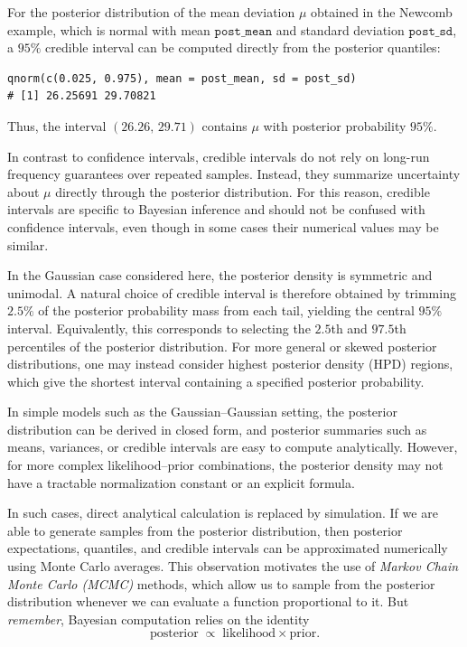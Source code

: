 For the posterior distribution of the mean deviation $\mu$ obtained in the Newcomb example, which is normal with mean $\texttt{post\_mean}$ and standard deviation $\texttt{post\_sd}$, a $95\%$ credible interval can be computed directly from the posterior quantiles:
\begin{verbatim}
qnorm(c(0.025, 0.975), mean = post_mean, sd = post_sd)
# [1] 26.25691 29.70821
\end{verbatim}

Thus, the interval $(26.26,\,29.71)$ contains $\mu$ with posterior probability $95\%$. 

\medskip
\noindent
In contrast to confidence intervals, credible intervals do not rely on long-run frequency guarantees over repeated samples. 
Instead, they summarize uncertainty about $\mu$ directly through the posterior distribution.
For this reason, credible intervals are specific to Bayesian inference and should not be confused with confidence intervals, even though in some cases their numerical values may be similar.

In the Gaussian case considered here, the posterior density is symmetric and unimodal. 
A natural choice of credible interval is therefore obtained by trimming $2.5\%$ of the posterior probability mass from each tail, yielding the central $95\%$ interval. 
Equivalently, this corresponds to selecting the $2.5$th and $97.5$th percentiles of the posterior distribution.
For more general or skewed posterior distributions, one may instead consider highest posterior density (HPD) regions, which give the shortest interval containing a specified posterior probability.

\medskip
\noindent
In simple models such as the Gaussian–Gaussian setting, the posterior distribution can be derived in closed form, and posterior summaries such as means, variances, or credible intervals are easy to compute analytically.
However, for more complex likelihood–prior combinations, the posterior density may not have a tractable normalization constant or an explicit formula.

In such cases, direct analytical calculation is replaced by simulation.
If we are able to generate samples from the posterior distribution, then posterior expectations, quantiles, and credible intervals can be approximated numerically using Monte Carlo averages.
This observation motivates the use of \emph{Markov Chain Monte Carlo (MCMC)} methods, which allow us to sample from the posterior distribution whenever we can evaluate a function proportional to it.
But \emph{remember}, Bayesian computation relies on the identity
\[
\text{posterior} \;\propto\; \text{likelihood} \times \text{prior}.
\]


